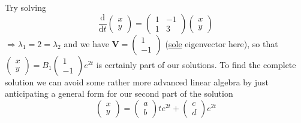 \documentclass[12pt]{report}
\theoremstyle{definition}
\begin{document}
\begin{ex}
\begin{enumerate}[label = (\roman*)]
            Try solving
            \begin{equation}\label{eqn:8}
                \frac{\mathrm{d}}{\mathrm{d}t} \begin{pmatrix}
                        x \\
                        y
                \end{pmatrix} = \begin{pmatrix}
                1 & -1 \\
                1 & 3
                \end{pmatrix} \begin{pmatrix}
                        x \\
                        y
                \end{pmatrix} 
            \end{equation}
            $\Rightarrow{}\lambda_1 = 2 = \lambda_2$ and we have $\pmb{V} = \begin{pmatrix}
                    1 \\
                    -1
                \end{pmatrix}$ (\underline{sole} eigenvector here),
                so that $\begin{pmatrix}
                        x \\
                        y
                \end{pmatrix} = B_1 \begin{pmatrix}
                        1 \\
                        -1
                \end{pmatrix} e^{2t}$ is certainly part of our solutions.
                To find the complete solution we can avoid some rather more
                advanced linear algebra by just anticipating a general form 
                for our second part of the solution\[
                    \begin{pmatrix}
                            x \\
                            y
                    \end{pmatrix} = \begin{pmatrix}
                            a \\
                            b
                    \end{pmatrix} t e^{2t} + \begin{pmatrix}
                            c \\
                            d
                    \end{pmatrix} e^{2t}
\]
\end{enumerate}
\end{ex}
\end{document}

